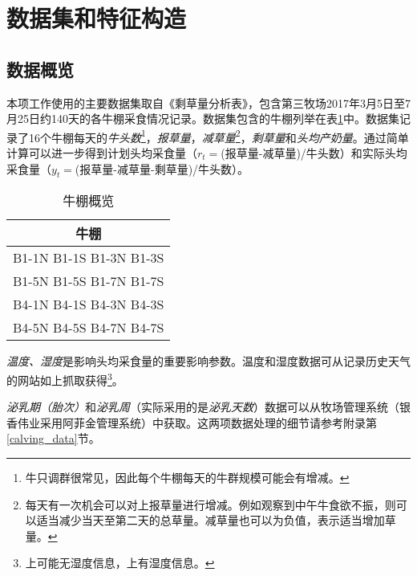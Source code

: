 \section{数据集和特征构造}
\label{dataset}

\subsection{数据概览}

本项工作使用的主要数据集取自《剩草量分析表》，包含第三牧场2017年3月5日至7月25日约140天的各牛棚采食情况记录。数据集包含的牛棚列举在表\ref{cowshed}中。数据集记录了16个牛棚每天的\emph{牛头数}\footnote{牛只调群很常见，因此每个牛棚每天的牛群规模可能会有增减。}，\emph{报草量}，\emph{减草量}\footnote{每天有一次机会可以对上报草量进行增减。例如观察到中午牛食欲不振，则可以适当减少当天至第二天的总草量。减草量也可以为负值，表示适当增加草量。}，\emph{剩草量}和\emph{头均产奶量}。通过简单计算可以进一步得到计划头均采食量（$r_t =$(报草量-减草量)/牛头数）和实际头均采食量（$y_t =$(报草量-减草量-剩草量)/牛头数）。

\begin{table}
\caption{牛棚概览}
\label{cowshed}
\footnotesize
\begin{center}
\begin{tabular}{|c|}
\hline
	\textbf{牛棚}  \\
\hline
    B1-1N  B1-1S  
    B1-3N  B1-3S  \\
    B1-5N  B1-5S  
    B1-7N  B1-7S  \\
    B4-1N  B4-1S  
    B4-3N  B4-3S  \\
    B4-5N  B4-5S  
    B4-7N  B4-7S  \\
\hline
\end{tabular}
\end{center}
\end{table}


\emph{温度、湿度}是影响头均采食量的重要影响参数。温度和湿度数据可从记录历史天气的网站如\cite{weather,tianqi}上抓取获得\footnote{\cite{weather}上可能无湿度信息，\cite{tianqi}上有湿度信息。}。

\emph{泌乳期（胎次）}和\emph{泌乳周}（实际采用的是\emph{泌乳天数}）数据可以从牧场管理系统（银香伟业采用阿菲金管理系统）中获取。这两项数据处理的细节请参考附录第\ref{calving_data}节。



